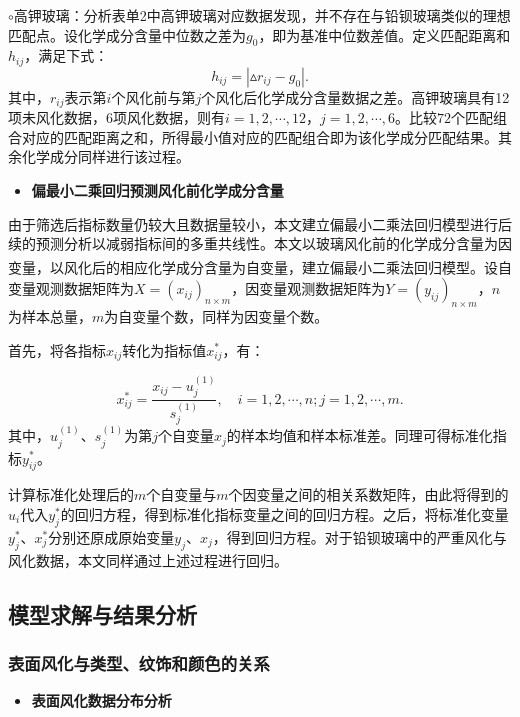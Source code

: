 \documentclass[withoutpreface,bwprint]{cumcmthesis} %
\begin{document}
$\circ$高钾玻璃：分析表单2中高钾玻璃对应数据发现，并不存在与铅钡玻璃类似的理想匹配点。设化学成分含量中位数之差为$g_0$，即为基准中位数差值。定义匹配距离和$h_{ij}$，满足下式：
\begin{equation}
 h_{ij} = |\vartriangle r_{ij} - g_0|.
\end{equation}
其中，$r_{ij}$表示第$i$个风化前与第$j$个风化后化学成分含量数据之差。高钾玻璃具有12项未风化数据，6项风化数据，则有$i = 1,2,\cdots,12$，$j = 1,2,\cdots,6$。比较$72$个匹配组合对应的匹配距离之和，所得最小值对应的匹配组合即为该化学成分匹配结果。其余化学成分同样进行该过程。


\begin{itemize}
\item \textbf{偏最小二乘回归预测风化前化学成分含量}
\end{itemize}

由于筛选后指标数量仍较大且数据量较小，本文建立偏最小二乘法回归模型进行后续的预测分析以减弱指标间的多重共线性。本文以玻璃风化前的化学成分含量为因变量，以风化后的相应化学成分含量为自变量，建立偏最小二乘法回归模型\textsuperscript{\cite{ref4}}。设自变量观测数据矩阵为$X=(x_{ij})_{n\times m}$，因变量观测数据矩阵为$Y=(y_{ij})_{n\times m}$，$n$为样本总量，$m$为自变量个数，同样为因变量个数。

首先，将各指标$x_{ij}$转化为指标值$x_{ij}^*$，有：

\begin{equation}
  x_{ij}^*=\frac{x_{ij}-u_{j}^{(1)}}{s_{j}^{(1)}},\quad i = 1,2,\cdots,n;j = 1,2,\cdots,m.
\end{equation}
其中，$u_{j}^{(1)}$、$s_{j}^{(1)}$为第$j$个自变量$x_j$的样本均值和样本标准差。同理可得标准化指标$y_{ij}^*$。

计算标准化处理后的$m$个自变量与$m$个因变量之间的相关系数矩阵，由此将得到的$u_i$代入$y_j^*$的回归方程，得到标准化指标变量之间的回归方程。之后，将标准化变量$y_j^*$、$x_j^*$分别还原成原始变量$y_j$、$x_j$，得到回归方程。对于铅钡玻璃中的严重风化与风化数据，本文同样通过上述过程进行回归。

\subsection{模型求解与结果分析}

\subsubsection{表面风化与类型、纹饰和颜色的关系}

\begin{itemize}
	\item \textbf{表面风化数据分布分析}
\end{itemize}
\end{document}
